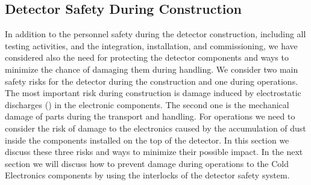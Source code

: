 \subsection{Detector Safety During Construction}
\label{sec:fdsp-tpcelec-safety-detcon}


In addition to the personnel safety during the detector
construction, including all testing activities, and the
integration, installation, and commissioning, we have 
considered also the need for protecting the detector
components and ways to minimize the chance of damaging
them during handling. We consider two main safety risks 
for the detector during the construction and one during
operations. The most important risk during construction is damage 
induced by electrostatic discharges () in the 
electronic components. The second one is the mechanical damage of 
parts during the transport and handling. For operations we
need to consider the risk of damage to the electronics 
caused by the accumulation of dust inside the components
installed on the top of the detector. In this section 
we discuss these three risks and ways to minimize their possible 
impact. In the next section we will discuss how to prevent
damage during operations to the Cold Electronics components 
by using the interlocks of the detector safety system.

